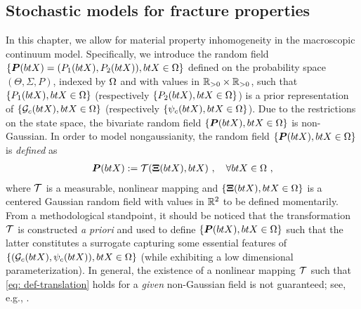\subsection{Stochastic models for fracture properties}
\label{section: Chapter4/theory/stochastic}

In this chapter, we allow for material property inhomogeneity in the macroscopic continuum model. Specifically, we introduce the random field $\{\boldsymbol{P}(btX) = (P_1(btX), P_2(btX)), btX \in \Omega\}$ defined on the probability space $(\Theta, \Sigma, P)$, indexed by $\Omega$ and with values in $\mathbb{R}_{>0} \times \mathbb{R}_{>0}$, such that $\{P_1(btX), btX \in \Omega\}$
(respectively $\{P_2(btX), btX \in \Omega\}$) is a prior representation of $\{{\mathcal{G}_c}(btX), btX \in \Omega\}$ (respectively $\{\psi_c(btX), btX \in \Omega\}$).
Due to the restrictions on the state space, the bivariate random field $\{\boldsymbol{P}(btX), btX \in \Omega\}$ is non-Gaussian. In order to model nongaussianity, the random field $\{\boldsymbol{P}(btX), btX \in \Omega\}$ is \textit{defined} as
\begin{align}
  \boldsymbol{P}(btX) := \mathcal{T}(\boldsymbol{\Xi}(btX), btX)~, \quad \forall btX \in \Omega~, \label{eq: def-translation}
\end{align}
where $\mathcal{T}$ is a measurable, nonlinear mapping and $\{\boldsymbol{\Xi}(btX),btX \in \Omega\}$ is a centered Gaussian random field with values in $\mathbb{R}^2$ to be defined momentarily. From a methodological standpoint, it should be noticed that the transformation $\mathcal{T}$ is constructed \textit{a priori} and used to define $\{\boldsymbol{P}(btX), btX \in \Omega\}$ such that the latter constitutes a surrogate capturing some essential features of $\{({\mathcal{G}_c}(btX),\psi_c(btX)), btX \in \Omega\}$
(while exhibiting a low dimensional parameterization). In general, the existence of a nonlinear mapping $\mathcal{T}$ such that \eqref{eq: def-translation} holds for a \textit{given} non-Gaussian field is not guaranteed; see, e.g., \cite{Grigoriu2009}.

